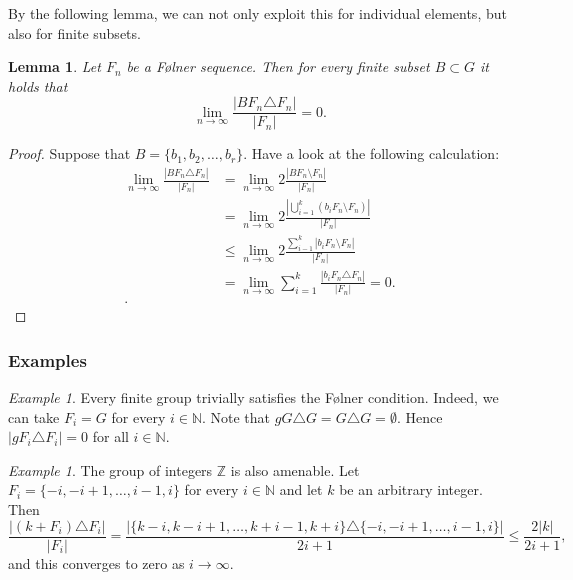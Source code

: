 \documentclass[titlepage, a4paper]{article}
\newcommand{\N}{\mathbb{N}}
\newcommand{\Z}{\mathbb{Z}}
\newcommand{\card}[1]{\left| #1 \right|}
\newtheorem{lemma}[theorem]{Lemma}
\theoremstyle{remark}
\newtheorem{example}[theorem]{Example}
\begin{document}
By the following lemma, we can not only exploit this for individual elements, but also for finite subsets.
\begin{lemma}\label{lem:folner_finite_subset}
    Let $F_n$ be a Følner sequence. Then for every finite subset $B \subset G$ it holds that  \[
    \lim_{n \to \infty} \frac{\card{BF_n \triangle F_n}}{\card{F_n}} = 0    
    .\] 
\end{lemma}
\begin{proof}
    Suppose that $B = \{b_1, b_2, \ldots, b_r\} $. 
    Have a look at the following calculation:
    \begin{align*}
        \lim_{n \to \infty} \frac{\card{BF_n \triangle F_n}}{\card{F_n}} &= \lim_{n \to \infty} 2 \frac{\card{BF_n \setminus F_n}}{\card{F_n}} \\
                                         &= \lim_{n \to \infty} 2 \frac{\card{\bigcup_{i = 1}^{k} (b_i F_n \setminus F_n)}}{\card{F_n}} \\
                                         &\le \lim_{n \to \infty} 2\frac{\sum_{i-1}^{k} \card{b_i F_n \setminus F_n}}{\card{F_n}} \\
                                         &= \lim_{n \to \infty} \sum_{i = 1}^{k} \frac{\card{b_iF_n \triangle F_n}}{\card{F_n}} = 0.  \\
    .\end{align*}
\end{proof}

\subsubsection{Examples}
\begin{example}\label{ex:finite_group_folner}
    Every finite group trivially satisfies the Følner condition. Indeed, we can take $F_i = G$ for every $i \in \N$. Note that $gG \triangle G = G \triangle G = \emptyset$. Hence $\card{gF_i\triangle F_i} = 0$ for all $i \in \N$.
\end{example}

\begin{example}\label{ex:integers_folner}
    The group of integers $\Z$ is also amenable. Let $F_i = \{-i, -i+1, \dots, i-1, i\}$ for every $i \in \N$ and let $k$ be an arbitrary integer. Then
    \[
        \frac{\card{(k + F_i) \triangle F_i}}{\card{F_i}}
        = \frac{\card{\{k-i, k-i+1, \dots, k+i-1, k+i\}\triangle \{-i, -i+1, \dots, i-1, i\}}}{2i+1}
        \leq \frac{2|k|}{2i+1},
    \]
    and this converges to zero as $i \to \infty$.
\end{example}
\end{document}
